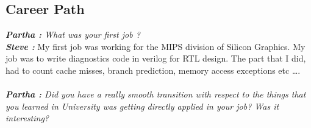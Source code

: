 \documentclass[a4paper, 12pt]{article}
\begin{document}
\begin{flushleft}
        \section*{Career Path}
	\textit {\textbf{Partha :} What was your first job ?} \\ 
 	\textbf {\textit {Steve :}} My first job was working for the MIPS division of Silicon Graphics. My job was to write diagnostics code in verilog for RTL design. The part that I did, had to count cache misses, branch prediction, memory access exceptions etc \ldots. \\~\\ 
	\textit {\textbf{Partha :} Did you have a really smooth transition with respect to the things that you learned in University was getting directly applied in your job? Was it interesting?} \\ 

\end{flushleft}
\end{document}
